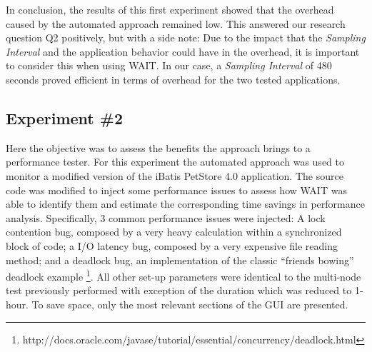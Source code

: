 \documentclass[runningheads,a4paper]{llncs}
\begin{document}

In conclusion, the results of this first experiment showed that the overhead
caused by the automated approach remained low. This answered our research
question Q2 positively, but with a side note: Due to the impact that the
\emph{Sampling Interval} and the application behavior could have in the
overhead, it is important to consider this when using WAIT. In our case, a
\emph{Sampling Interval} of 480 seconds proved efficient in terms of overhead for the two tested applications.

\vspace{-5pt}
\subsection{Experiment \#2}
\vspace{-2pt}
Here the objective was to assess the benefits the approach brings to a
performance tester. For this experiment the automated approach was used to
monitor a modified version of the iBatis PetStore 4.0 application. The source
code was modified to inject some performance issues to assess how WAIT was able
to identify them and estimate the corresponding time savings in performance
analysis. Specifically, 3 common performance issues were injected: A lock
contention bug, composed by a very heavy calculation within a synchronized block
of code; a I/O latency bug, composed by a very expensive file reading method;
and a deadlock bug, an implementation of the classic ``friends bowing'' deadlock example
\footnote{http://docs.oracle.com/javase/tutorial/essential/concurrency/deadlock.html}.
All other set-up parameters were identical to the multi-node test
previously performed with exception of the duration which was reduced to 1-hour.
To save space, only the most relevant sections of the GUI are presented.
\end{document}

